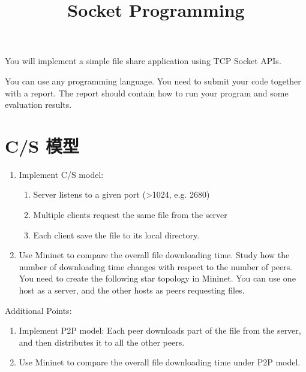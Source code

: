 \endofdump
{}

\title{Socket Programming}
\maketitle

You will implement a simple file share application using TCP Socket APIs. 

You can use any programming language. You need to submit your code together with a report. The report should contain how to run your program and some evaluation results.

\section{C/S 模型}

\begin{enumerate}
    \item Implement C/S model: 
    \begin{enumerate}
        \item Server listens to a given port (>1024, e.g. 2680)
        \item Multiple clients request the same file from the server
        \item Each client save the file to its local directory.
    \end{enumerate}
    \item Use Mininet to compare the overall file downloading time. Study how the number of downloading time changes with respect to the number of peers. You need to create the following star topology in Mininet. You can use one host as a server, and the other hosts as peers requesting files.
    \begin{figure}[h]
        \centering
        
    \end{figure}
\end{enumerate}



Additional Points:

\begin{enumerate}
    \item Implement P2P model: Each peer downloads part of the file from the server, and then distributes it to all the other peers.

    \item Use Mininet to compare the overall file downloading time under P2P model.
\end{enumerate}

